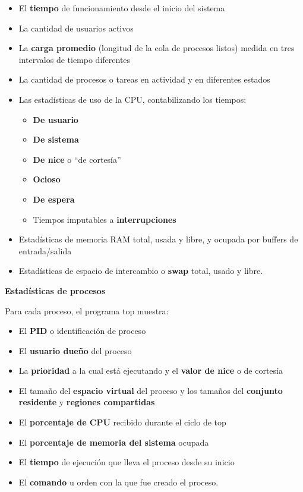 \documentclass[spanish,a4paper,]{article}
\providecommand{\tightlist}{%
  \setlength{\itemsep}{0pt}\setlength{\parskip}{0pt}}
\begin{document}
\begin{itemize}
\tightlist
\item
  El \textbf{tiempo} de funcionamiento desde el inicio del sistema
\item
  La cantidad de usuarios activos
\item
  La \textbf{carga promedio} (longitud de la cola de procesos listos)
  medida en tres intervalos de tiempo diferentes
\item
  La cantidad de procesos o tareas en actividad y en diferentes estados
\item
  Las estadísticas de uso de la CPU, contabilizando los tiempos:

  \begin{itemize}
  \tightlist
  \item
    \textbf{De usuario}
  \item
    \textbf{De sistema}
  \item
    \textbf{De nice} o ``de cortesía''
  \item
    \textbf{Ocioso}
  \item
    \textbf{De espera}
  \item
    Tiempos imputables a \textbf{interrupciones}
  \end{itemize}
\item
  Estadísticas de memoria RAM total, usada y libre, y ocupada por
  buffers de entrada/salida
\item
  Estadísticas de espacio de intercambio o \textbf{swap} total, usado y
  libre.
\end{itemize}

\textbf{Estadísticas de procesos}

Para cada proceso, el programa top muestra:

\begin{itemize}
\tightlist
\item
  El \textbf{PID} o identificación de proceso
\item
  El \textbf{usuario dueño} del proceso
\item
  La \textbf{prioridad} a la cual está ejecutando y el \textbf{valor de
  nice} o de cortesía
\item
  El tamaño del \textbf{espacio virtual} del proceso y los tamaños del
  \textbf{conjunto residente} y \textbf{regiones compartidas}
\item
  El \textbf{porcentaje de CPU} recibido durante el ciclo de top
\item
  El \textbf{porcentaje de memoria del sistema} ocupada
\item
  El \textbf{tiempo} de ejecución que lleva el proceso desde su inicio
\item
  El \textbf{comando} u orden con la que fue creado el proceso.
\end{itemize}
\end{document}

